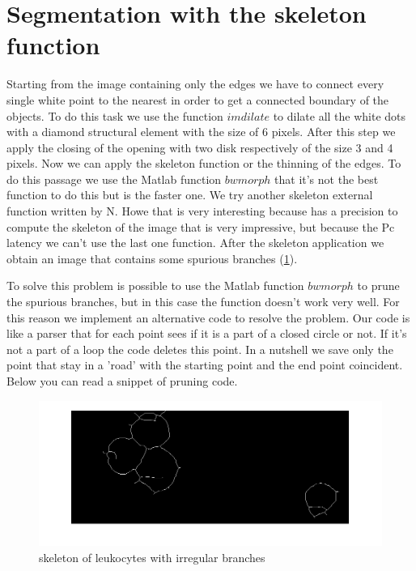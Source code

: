 \section{Segmentation with the skeleton function}
Starting from the image containing only the edges we have to connect every single white point to the nearest in order to get a connected boundary of the objects. To do this task we use the function $imdilate$ to dilate all the white dots with a diamond structural element with the size of 6 pixels. After this step we apply the closing of the opening with two disk respectively of the size 3 and 4 pixels. Now we can apply the skeleton function or the thinning of the edges. To do this passage we use the Matlab function $bwmorph$ that it's not the best function to do this but is the faster one. We try another skeleton external function written by N. Howe that is very interesting because has a precision to compute the skeleton of the image that is very impressive, but because the Pc latency we can't use the last one function. After the skeleton application we obtain an image that contains some spurious branches (\ref{fig:skel}). 

\bigskip

To solve this problem is possible to use the Matlab function $bwmorph$ to prune the spurious branches, but in this case the function doesn’t work very well. For this reason we implement an alternative code to resolve the problem. Our code is like a parser that for each point sees if it is a part of a closed circle or not. If it's not a part of a loop the code deletes this point. In a nutshell we save only the point that stay in a 'road' with the starting point and the end point coincident. Below you can read a snippet of pruning code.
\begin{figure}
	\begin{center}
		\centering
		\includegraphics[scale=0.5]{img/skel.png}
		\caption{skeleton of leukocytes with irregular branches}
		\label{fig:skel}
	\end{center}
\end{figure}

